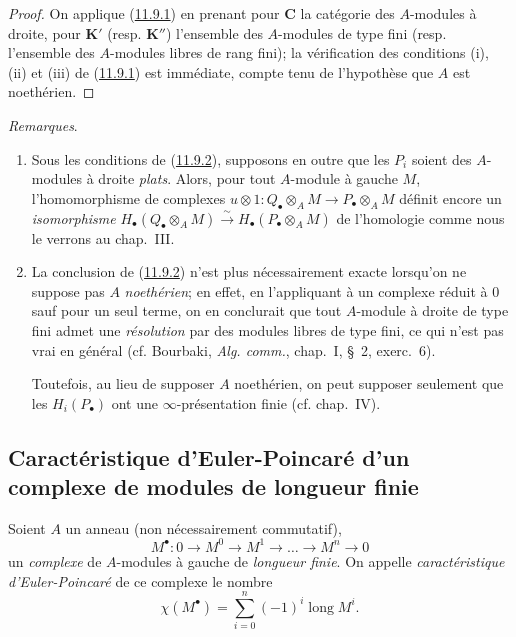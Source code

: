 \begin{proof}
On applique (\hyperref[0.11.9.1-fr]{11.9.1}) en prenant pour $\boldsymbol{C}$ la
catégorie des $A$-modules à droite, pour $\boldsymbol{K}'$ (resp. $\boldsymbol{K}''$) l'ensemble des
$A$-modules de type fini (resp. l'ensemble des $A$-modules libres de rang
fini); la vérification des conditions (i), (ii) et (iii) de
(\hyperref[0.11.9.1-fr]{11.9.1}) est immédiate, compte tenu de l'hypothèse
que $A$ est noethérien.
\end{proof}

\begin{env}[11.9.3]
\label{0.11.9.3-fr}
\emph{Remarques}.
\begin{enumerate}
\item[{\rm(i)}] Sous les conditions de
(\hyperref[0.11.9.2-fr]{11.9.2}), supposons en outre que les $P_i$ soient des
$A$-modules à droite \emph{plats}. Alors, pour tout $A$-module à gauche $M$,
l'homomorphisme de complexes
$u\otimes 1:Q_\bullet\otimes_A M\to P_\bullet\otimes_A M$
définit encore un \emph{isomorphisme}
$H_\bullet(Q_\bullet\otimes_A M)\xrightarrow{\sim}
H_\bullet(P_\bullet\otimes_A M)$ de l'homologie comme nous le verrons au
chap.~III.
\item[{\rm(ii)}] La conclusion de (\hyperref[0.11.9.2-fr]{11.9.2}) n'est
plus nécessairement exacte lorsqu'on ne suppose pas $A$ \emph{noethérien}; en
effet, en l'appliquant à un complexe réduit à $0$ sauf pour un seul terme, on
en conclurait que tout $A$-module à droite de type fini admet une \emph{résolution}
par des modules libres de type fini, ce qui n'est pas vrai en général
(cf. Bourbaki, \emph{Alg. comm.}, chap.~I, \S~2, exerc.~6).

Toutefois, au lieu de supposer $A$ noethérien, on peut supposer seulement que
les $H_i(P_\bullet)$ ont une $\infty$-présentation finie (cf. chap.~IV).
\end{enumerate}
\end{env}

\subsection{Caractéristique d'Euler-Poincaré d'un complexe de modules de
longueur finie}
\label{subsection:0.11.10-fr}

\begin{env}[11.10.1]
\label{0.11.10.1-fr}
Soient $A$ un anneau (non nécessairement commutatif),
\[
\label{0.11.10.1.1-fr}
\tag{11.10.1.1}
M^\bullet:0\longrightarrow M^0\longrightarrow M^1
\longrightarrow\ldots\longrightarrow M^n\longrightarrow0
\]
un \emph{complexe} de $A$-modules à gauche de \emph{longueur finie}. On appelle
\emph{caractéristique d'Euler-Poincaré} de ce complexe le nombre
\[
\label{0.11.10.1.2-fr}
\tag{11.10.1.2}
\chi(M^\bullet)=\sum_{i=0}^{n}(-1)^i\operatorname{long}M^i.
\]
\end{env}

